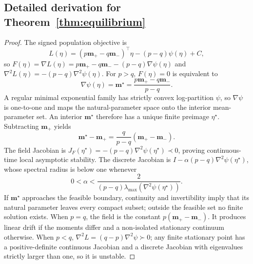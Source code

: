 \subsection{Detailed derivation for Theorem~\ref{thm:equilibrium}}
\label{app:proof-theorem-equilibrium}
\begin{proof}
The signed population objective is
\begin{equation}
L(\eta)=(p\mathbf m_+-q\mathbf m_-)^\top\eta-(p-q)\psi(\eta)+C,
\end{equation}
so
$F(\eta)=\nabla L(\eta)=p\mathbf m_+-q\mathbf m_--(p-q)\nabla\psi(\eta)$ and
$\nabla^2L(\eta)=-(p-q)\nabla^2\psi(\eta)$.
For $p>q$, $F(\eta)=0$ is equivalent to
\begin{equation}
\nabla\psi(\eta)=\mathbf m^\star=\frac{p\mathbf m_+-q\mathbf m_-}{p-q}.
\end{equation}
A regular minimal exponential family has strictly convex log-partition $\psi$, so $\nabla\psi$ is one-to-one and maps the natural-parameter space onto the interior mean-parameter set. An interior $\mathbf m^\star$ therefore has a unique finite preimage $\eta^\star$. Subtracting $\mathbf m_+$ yields
\begin{equation}
\mathbf m^\star-\mathbf m_+=\frac{q}{p-q}(\mathbf m_+-\mathbf m_-).
\end{equation}
The field Jacobian is $J_F(\eta^\star)=-(p-q)\nabla^2\psi(\eta^\star)\prec0$, proving continuous-time local asymptotic stability. The discrete Jacobian is
$I-\alpha(p-q)\nabla^2\psi(\eta^\star)$, whose spectral radius is below one whenever
\begin{equation}
0<\alpha<\frac{2}{(p-q)\lambda_{\max}(\nabla^2\psi(\eta^\star))}.
\end{equation}
If $\mathbf m^\star$ approaches the feasible boundary, continuity and invertibility imply that its natural parameter leaves every compact subset; outside the feasible set no finite solution exists.
When $p=q$, the field is the constant $p(\mathbf m_+-\mathbf m_-)$. It produces linear drift if the moments differ and a non-isolated stationary continuum otherwise.
When $p<q$, $\nabla^2L=(q-p)\nabla^2\psi\succ0$; any finite stationary point has a positive-definite continuous Jacobian and a discrete Jacobian with eigenvalues strictly larger than one, so it is unstable.
\end{proof}

